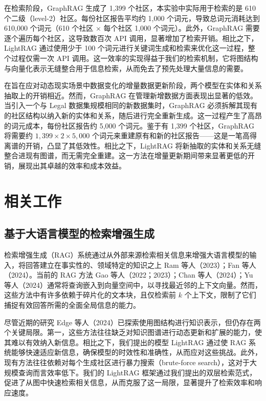 \documentclass[11pt,UTF8,fontset=fandol]{ctexart}
\begin{document}
在检索阶段，GraphRAG 生成了 1{,}399 个社区，本实验中实际用于检索的是 610 个二级（level-2）社区。每份社区报告平均约 1{,}000 个词元，导致总词元消耗达到 610{,}000 个词元（610 个社区 $\times$ 每个社区 1{,}000 个词元）。此外，GraphRAG 需要逐个遍历每个社区，这导致数百次 API 调用，显著增加了检索开销。相比之下，LightRAG 通过使用少于 100 个词元进行关键词生成和检索来优化这一过程，整个过程仅需一次 API 调用。这一效率的实现得益于我们的检索机制，它将图结构与向量化表示无缝整合用于信息检索，从而免去了预先处理大量信息的需要。

在旨在应对动态现实场景中数据变化的增量数据更新阶段，两个模型在实体和关系抽取上的开销相近。然而，GraphRAG 在管理新增数据方面表现出显著的低效。当引入一个与 Legal 数据集规模相同的新数据集时，GraphRAG 必须拆解其现有的社区结构以纳入新的实体和关系，随后进行完全重新生成。这一过程产生了高昂的词元成本，每份社区报告约 5{,}000 个词元。鉴于有 1{,}399 个社区，GraphRAG 将需要约 $1{,}399 \times 2 \times 5{,}000$ 个词元来重建原有和新的社区报告——这是一笔高得离谱的开销，凸显了其低效性。相比之下，LightRAG 将新抽取的实体和关系无缝整合进现有图谱，而无需完全重建。这一方法在增量更新期间带来显著更低的开销，展现出其卓越的效率和成本效益。

\section{相关工作}
\subsection{基于大语言模型的检索增强生成}

检索增强生成（RAG）系统通过从外部来源检索相关信息来增强大语言模型的输入，将回答建立在事实性的、领域特定的知识之上 Ram 等人（2023）；Fan 等人（2024）。当前的 RAG 方法 Gao 等人（2022；2023）；Chan 等人（2024）；Yu 等人（2024）通常将查询嵌入到向量空间中，以寻找最近邻的上下文向量。然而，这些方法中有许多依赖于碎片化的文本块，且仅检索前 $k$ 个上下文，限制了它们捕捉有效回答所需的全面全局信息的能力。

尽管近期的研究 Edge 等人（2024）已探索使用图结构进行知识表示，但仍存在两个关键局限。第一，这些方法往往缺乏对知识图谱进行动态更新和扩展的能力，使其难以有效纳入新信息。相比之下，我们提出的模型 LightRAG 通过使 RAG 系统能够快速适应新信息，确保模型的时效性和准确性，从而应对这些挑战。此外，现有方法往往依赖对每个生成社区进行暴力搜索（brute-force search），这对于大规模查询而言效率低下。我们的 LightRAG 框架通过我们提出的双层检索范式，促进了从图中快速检索相关信息，从而克服了这一局限，显著提升了检索效率和响应速度。
\end{document}
